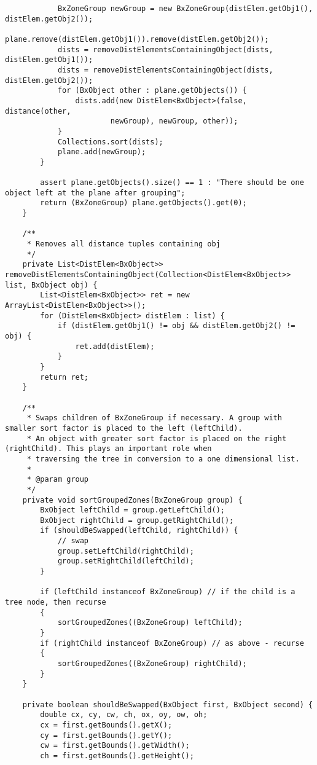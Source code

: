 \begin{appendices}
\begin{lstlisting}
            BxZoneGroup newGroup = new BxZoneGroup(distElem.getObj1(), distElem.getObj2());
            plane.remove(distElem.getObj1()).remove(distElem.getObj2());
            dists = removeDistElementsContainingObject(dists, distElem.getObj1());
            dists = removeDistElementsContainingObject(dists, distElem.getObj2());
            for (BxObject other : plane.getObjects()) {
                dists.add(new DistElem<BxObject>(false, distance(other,
                        newGroup), newGroup, other));
            }
            Collections.sort(dists);
            plane.add(newGroup);
        }
        
        assert plane.getObjects().size() == 1 : "There should be one object left at the plane after grouping";
        return (BxZoneGroup) plane.getObjects().get(0);
    }

    /**
     * Removes all distance tuples containing obj
     */
    private List<DistElem<BxObject>> removeDistElementsContainingObject(Collection<DistElem<BxObject>> list, BxObject obj) {
        List<DistElem<BxObject>> ret = new ArrayList<DistElem<BxObject>>();
        for (DistElem<BxObject> distElem : list) {
            if (distElem.getObj1() != obj && distElem.getObj2() != obj) {
                ret.add(distElem);
            }
        }
        return ret;
    }

    /**
     * Swaps children of BxZoneGroup if necessary. A group with smaller sort factor is placed to the left (leftChild).
     * An object with greater sort factor is placed on the right (rightChild). This plays an important role when
     * traversing the tree in conversion to a one dimensional list.
     *
     * @param group
     */
    private void sortGroupedZones(BxZoneGroup group) {
        BxObject leftChild = group.getLeftChild();
        BxObject rightChild = group.getRightChild();
        if (shouldBeSwapped(leftChild, rightChild)) {
            // swap
            group.setLeftChild(rightChild);
            group.setRightChild(leftChild);
        }
        
        if (leftChild instanceof BxZoneGroup) // if the child is a tree node, then recurse
        {
            sortGroupedZones((BxZoneGroup) leftChild);
        }
        if (rightChild instanceof BxZoneGroup) // as above - recurse
        {
            sortGroupedZones((BxZoneGroup) rightChild);
        }
    }

    private boolean shouldBeSwapped(BxObject first, BxObject second) {
        double cx, cy, cw, ch, ox, oy, ow, oh;
        cx = first.getBounds().getX();
        cy = first.getBounds().getY();
        cw = first.getBounds().getWidth();
        ch = first.getBounds().getHeight();


\end{lstlisting}
\end{appendices}
